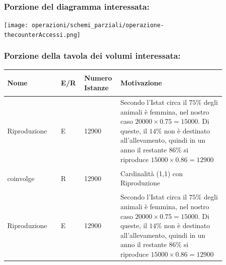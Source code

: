 \documentclass[12pt,a4paper]{article}
\begin{document}
\subsubsection*{Porzione del diagramma interessata:}

\texttt{[image: operazioni/schemi\_parziali/operazione-\\thecounterAccessi.png]} 
\subsubsection*{Porzione della tavola dei volumi interessata:}
\begin{center}\setlength{\extrarowheight}{1.5pt}\begin{longtable}{|p{0.23\linewidth}|p{0.1\linewidth}|p{0.11\linewidth}|p{0.45\linewidth}|}
\hline \textbf{Nome}   & \begin{center}\vspace{-15pt}\textbf{E/R}\end{center} & \textbf{Numero Istanze} & \textbf{Motivazione}\\ 
\hline
Riproduzione 				& \begin{center}
\vspace{-25pt}E
\end{center}
					& \begin{center}
					\vspace{-25pt}12900\end{center}
					&  Secondo l'Istat circa il $75\%$ degli animali è femmina, nel nostro caso $20000\times0.75=15000$. Di queste, il $14\%$ non è destinato all'allevamento, quindi in un anno il restante $86\%$ si riproduce $15000\times 0.86=12900$ \\ 

\hline
coinvolge 				& \begin{center}
\vspace{-25pt}R
\end{center}
					& \begin{center}
					\vspace{-25pt}12900\end{center}
					&  Cardinalità (1,1) con Riproduzione \\ 

\hline
Riproduzione 				& \begin{center}
\vspace{-25pt}E
\end{center}
					& \begin{center}
					\vspace{-25pt}12900\end{center}
					&  Secondo l'Istat circa il $75\%$ degli animali è femmina, nel nostro caso $20000\times0.75=15000$. Di queste, il $14\%$ non è destinato all'allevamento, quindi in un anno il restante $86\%$ si riproduce $15000\times 0.86=12900$ \\ 


\end{longtable}
\end{center}
\end{document}

